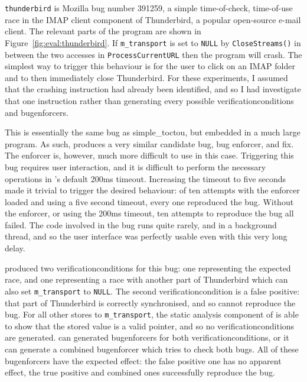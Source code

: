 \verb|thunderbird| is Mozilla bug number 391259\cite{Mery2007}, a
simple time-of-check, time-of-use race in the IMAP client component of
Thunderbird, a popular open-source e-mail client.  The relevant parts
of the program are shown in Figure~\ref{fig:eval:thunderbird}.  If
\verb|m_transport| is set to \verb|NULL| by \verb|CloseStreams()| in
between the two accesses in \verb|ProcessCurrentURL| then the program
will crash.  The simplest way to trigger this behaviour is for the
user to click on an IMAP folder and to then immediately close
Thunderbird.  For these experiments, I assumed that the crashing
instruction had already been identified, and so I had
{\implementation} investigate that one instruction rather than
generating every possible \glspl{verificationcondition} and
\glspl{bugenforcer}.

This is essentially the same bug as simple\_toctou, but embedded in a
much large program.  As such, {\implementation} produces a very
similar candidate bug, bug enforcer, and fix.  The enforcer is,
however, much more difficult to use in this case.  Triggering this bug
requires user interaction, and it is difficult to perform the
necessary operations in {\implementation}'s default 200ms timeout.
Increasing the timeout to five seconds made it trivial to trigger the
desired behaviour: of ten attempts with the enforcer loaded and using
a five second timeout, every one reproduced the bug.  Without the
enforcer, or using the 200ms timeout, ten attempts to reproduce the
bug all failed.  The code involved in the bug runs quite rarely, and
in a background thread, and so the user interface was perfectly usable
even with this very long delay.

{\Implementation} produced two \glspl{verificationcondition} for this
bug: one representing the expected race, and one representing a race
with another part of Thunderbird which can also set
\texttt{m\_transport} to \texttt{NULL}.  The second
\gls{verificationcondition} is a false positive: that part of
Thunderbird is correctly synchronised, and so cannot reproduce the
bug.  For all other stores to \texttt{m\_transport}, the static
analysis component of {\implementation} is able to show that the
stored value is a valid pointer, and so no
\glspl{verificationcondition} are generated.  {\Implementation} can
generated \glspl{bugenforcer} for both \glspl{verificationcondition},
or it can generate a combined \gls{bugenforcer} which tries to check
both bugs.  All of these \glspl{bugenforcer} have the expected effect:
the false positive one has no apparent effect, the true positive and
combined ones successfully reproduce the bug.

